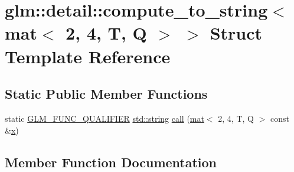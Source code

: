 \hypertarget{structglm_1_1detail_1_1compute__to__string_3_01mat_3_012_00_014_00_01_t_00_01_q_01_4_01_4}{}\section{glm\+:\+:detail\+:\+:compute\+\_\+to\+\_\+string$<$ mat$<$ 2, 4, T, Q $>$ $>$ Struct Template Reference}
\label{structglm_1_1detail_1_1compute__to__string_3_01mat_3_012_00_014_00_01_t_00_01_q_01_4_01_4}
\subsection*{Static Public Member Functions}
\begin{DoxyCompactItemize}
\item 
static \hyperlink{setup_8hpp_a33fdea6f91c5f834105f7415e2a64407}{G\+L\+M\+\_\+\+F\+U\+N\+C\+\_\+\+Q\+U\+A\+L\+I\+F\+I\+ER} \hyperlink{_s_d_l__opengl__glext_8h_ae84541b4f3d8e1ea24ec0f466a8c568b}{std\+::string} \hyperlink{structglm_1_1detail_1_1compute__to__string_3_01mat_3_012_00_014_00_01_t_00_01_q_01_4_01_4_a33aa32e523377e9a404a6eb7b4048e76}{call} (\hyperlink{structglm_1_1mat}{mat}$<$ 2, 4, T, Q $>$ const \&\hyperlink{_s_d_l__opengl_8h_ad0e63d0edcdbd3d79554076bf309fd47}{x})
\end{DoxyCompactItemize}


\subsection{Member Function Documentation}
\mbox{\label{structglm_1_1detail_1_1compute__to__string_3_01mat_3_012_00_014_00_01_t_00_01_q_01_4_01_4_a33aa32e523377e9a404a6eb7b4048e76}} 
